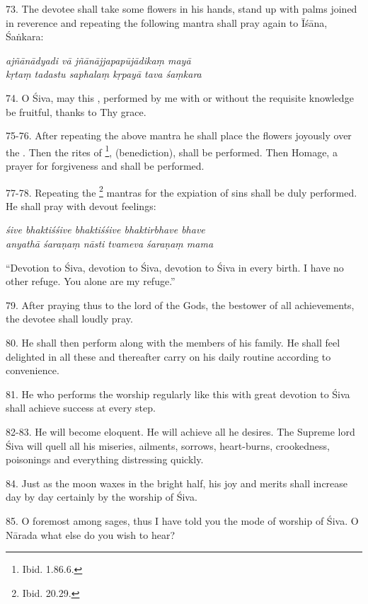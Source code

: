73. The devotee shall take some flowers in his hands, stand up with palms joined
in reverence and repeating the following mantra shall pray again to Īśāna,
Śaṅkara:

\begin{shloka}\itshape
  ajñānādyadi vā jñānājjapapūjādikaṃ mayā\\
  kṛtaṃ tadastu saphalaṃ kṛpayā tava śaṃkara
\end{shloka}

74. O Śiva, may this ,  \etc performed by me with or without
the requisite knowledge be fruitful, thanks to Thy grace.

75-76. After repeating the above mantra he shall place the flowers joyously over
the . Then the rites of \footnote{Ibid. 1.86.6.},
 (benediction),  shall be performed. Then Homage,
a prayer for forgiveness and  shall be performed.

77-78. Repeating the \footnote{Ibid. 20.29.} mantras for the expiation
of sins  shall be duly performed. He shall pray with devout
feelings:

\begin{shloka}\itshape
  śive bhaktiśśive bhaktiśśive bhaktirbhave bhave\\
  anyathā śaraṇaṃ nāsti tvameva śaraṇaṃ mama
\end{shloka}

“Devotion to Śiva, devotion to Śiva, devotion to Śiva in every birth. I have no
other refuge. You alone are my refuge.”

79. After praying thus to the lord of the Gods, the bestower of all achievements,
the devotee shall loudly pray.

80. He shall then perform  along with the members of his family.
He shall feel delighted in all these and thereafter carry on his daily routine
according to convenience.

81. He who performs the worship regularly like this with great devotion to Śiva
shall achieve success at every step.

82-83. He will become eloquent. He will achieve all he desires. The Supreme lord
Śiva will quell all his miseries, ailments, sorrows, heart-burns, crookedness,
poisonings and everything distressing quickly.

84. Just as the moon waxes in the bright half, his joy and merits shall increase
day by day certainly by the worship of Śiva.

85. O foremost among sages, thus I have told you the mode of worship of Śiva.
O Nārada what else do you wish to hear?
